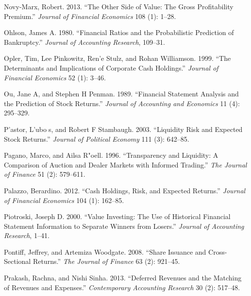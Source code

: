 \documentclass[
  letterpaper,
  DIV=11,
  numbers=noendperiod]{scrreprt}
\newlength{\cslhangindent}
\newlength{\cslentryspacingunit} %
\newenvironment{CSLReferences}[2] %
 {%
  \setlength{\parindent}{0pt}
  \ifodd #1
  \let\oldpar\par
  \def\par{\hangindent=\cslhangindent\oldpar}
  \fi
  \setlength{\parskip}{#2\cslentryspacingunit}
 }%
 {}
\begin{document}
\begin{CSLReferences}{1}{0}
\leavevmode{}%
Novy-Marx, Robert. 2013. {``The Other Side of Value: The Gross
Profitability Premium.''} \emph{Journal of Financial Economics} 108 (1):
1--28.

\leavevmode{}%
Ohlson, James A. 1980. {``Financial Ratios and the Probabilistic
Prediction of Bankruptcy.''} \emph{Journal of Accounting Research},
109--31.

\leavevmode{}%
Opler, Tim, Lee Pinkowitz, Ren'e Stulz, and Rohan Williamson. 1999.
{``The Determinants and Implications of Corporate Cash Holdings.''}
\emph{Journal of Financial Economics} 52 (1): 3--46.

\leavevmode{}%
Ou, Jane A, and Stephen H Penman. 1989. {``Financial Statement Analysis
and the Prediction of Stock Returns.''} \emph{Journal of Accounting and
Economics} 11 (4): 295--329.

\leavevmode{}%
P'astor, L'ubos, and Robert F Stambaugh. 2003. {``Liquidity Risk and
Expected Stock Returns.''} \emph{Journal of Political Economy} 111 (3):
642--85.

\leavevmode{}%
Pagano, Marco, and Ailsa R"oell. 1996. {``Transparency and Liquidity: A
Comparison of Auction and Dealer Markets with Informed Trading.''}
\emph{The Journal of Finance} 51 (2): 579--611.

\leavevmode{}%
Palazzo, Berardino. 2012. {``Cash Holdings, Risk, and Expected
Returns.''} \emph{Journal of Financial Economics} 104 (1): 162--85.

\leavevmode{}%
Piotroski, Joseph D. 2000. {``Value Investing: The Use of Historical
Financial Statement Information to Separate Winners from Losers.''}
\emph{Journal of Accounting Research}, 1--41.

\leavevmode{}%
Pontiff, Jeffrey, and Artemiza Woodgate. 2008. {``Share Issuance and
Cross-Sectional Returns.''} \emph{The Journal of Finance} 63 (2):
921--45.

\leavevmode{}%
Prakash, Rachna, and Nishi Sinha. 2013. {``Deferred Revenues and the
Matching of Revenues and Expenses.''} \emph{Contemporary Accounting
Research} 30 (2): 517--48.


\end{CSLReferences}
\end{document}
